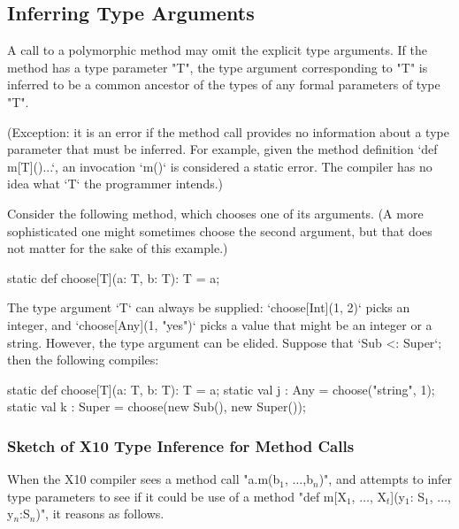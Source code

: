 {\subsection{Inferring Type Arguments}
\label{TypeParamInfer}


A call to a polymorphic method %
may omit the
explicit type arguments.  If the method has a type parameter
\xcd"T", the type argument corresponding to \xcd"T" is inferred
to be a common ancestor of the types of any formal
parameters of type \xcd"T".

(Exception: it is an error if the method call provides no information about
a type parameter that must be inferred.  For example, given the method
definition \xcd`def m[T](){...}`, an invocation \xcd`m()` is considered a
static error.  The compiler has no idea what \xcd`T` the programmer intends.)


Consider the following method, which chooses one of its arguments.  (A more
sophisticated one might sometimes choose the second argument, but that does
not matter for the sake of this example.)
\begin{xten}
static def choose[T](a: T, b: T): T = a; 
\end{xten}

The type argument \xcd`T` can always be supplied: 
\xcd`choose[Int](1, 2)` picks an integer, 
and \xcd`choose[Any](1, "yes")` picks a value that might be an integer or a
string.  
However, the type argument can be elided.  Suppose that \xcd`Sub <: Super`;
then the following compiles: 

\begin{xten}
  static def choose[T](a: T, b: T): T = a; 
  static val j : Any = choose("string", 1);
  static val k : Super = choose(new Sub(), new Super());
\end{xten}


\subsubsection{Sketch of X10 Type Inference for Method Calls}

When the X10 compiler sees a method call 
\xcdmath"a.m(b$_1$, $\ldots$,b$_n$)", and attempts to infer type parameters to see if it could be use of a
method \xcdmath"def m[X$_1$, $\ldots$, X$_t$](y$_1$: S$_1$, $\ldots$, y$_n$:S$_n$)", 
it reasons as follows. 



}
